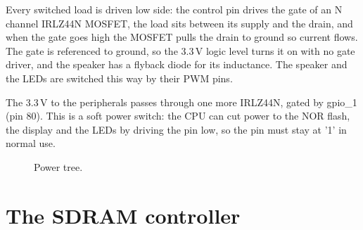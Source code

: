 \documentclass[a4paper,10pt]{article}
\begin{document}
Every switched load is driven low side: the control pin drives the gate of an N channel
IRLZ44N MOSFET, the load sits between its supply and the drain, and when the gate goes high
the MOSFET pulls the drain to ground so current flows. The gate is referenced to ground, so
the 3.3\,V logic level turns it on with no gate driver, and the speaker has a flyback diode
for its inductance. The speaker and the LEDs are switched this way by their PWM pins.

The 3.3\,V to the peripherals passes through one more IRLZ44N, gated by gpio\_1
(pin 80). This is a soft power switch: the CPU can cut power to the NOR flash, the display
and the LEDs by driving the pin low, so the pin must stay at '1' in normal use.

\begin{figure}[H]
\centering
{}
\caption{Power tree.}
\label{fig:power}
\end{figure}

\section{The SDRAM controller}
\label{sec:sdram}
\end{document}
